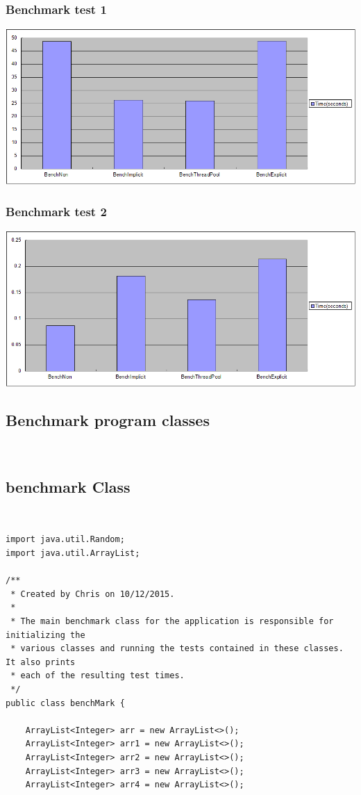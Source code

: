 \documentclass[10pt]{article}  %
\theoremstyle{definition}
\theoremstyle{remark}
\begin{document}
\begin{appendices}
\subsubsection{Benchmark test 1}\label{abt1}
\includegraphics[width=170mm]{benchAMD.png}
\subsubsection{Benchmark test 2}\label{abt1}
\includegraphics[width=170mm]{benchAMD2.png}

\subsection{Benchmark program classes}\
\subsection{benchmark Class}\
\begin{lstlisting}
import java.util.Random;
import java.util.ArrayList;

/**
 * Created by Chris on 10/12/2015.
 *
 * The main benchmark class for the application is responsible for initializing the
 * various classes and running the tests contained in these classes. It also prints
 * each of the resulting test times.
 */
public class benchMark {

    ArrayList<Integer> arr = new ArrayList<>();
    ArrayList<Integer> arr1 = new ArrayList<>();
    ArrayList<Integer> arr2 = new ArrayList<>();
    ArrayList<Integer> arr3 = new ArrayList<>();
    ArrayList<Integer> arr4 = new ArrayList<>();


\end{lstlisting}
\end{appendices}
\end{document}
